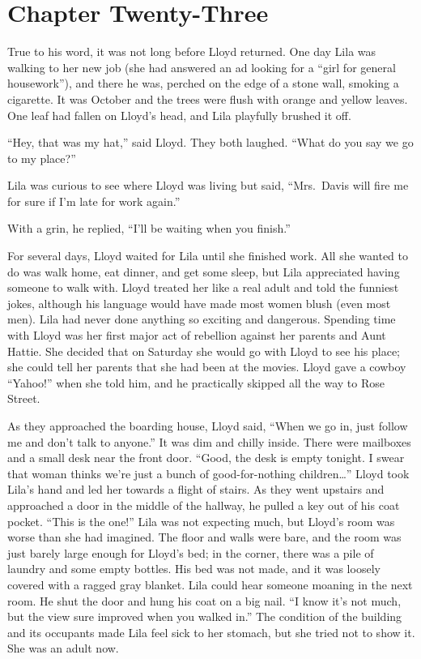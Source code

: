 \documentclass[
  american,
  letterpaper,
]{book}
\begin{document}

\chapter{Chapter Twenty-Three}\label{chapter-twenty-three}

True to his word, it was not long before Lloyd returned. One day Lila
was walking to her new job (she had answered an ad looking for a ``girl
for general housework''), and there he was, perched on the edge of a
stone wall, smoking a cigarette. It was October and the trees were flush
with orange and yellow leaves. One leaf had fallen on Lloyd's head, and
Lila playfully brushed it off.

``Hey, that was my hat,'' said Lloyd. They both laughed. ``What do you
say we go to my place?''

Lila was curious to see where Lloyd was living but said, ``Mrs.~Davis
will fire me for sure if I'm late for work again.''

With a grin, he replied, ``I'll be waiting when you finish.''

For several days, Lloyd waited for Lila until she finished work. All she
wanted to do was walk home, eat dinner, and get some sleep, but Lila
appreciated having someone to walk with. Lloyd treated her like a real
adult and told the funniest jokes, although his language would have made
most women blush (even most men). Lila had never done anything so
exciting and dangerous. Spending time with Lloyd was her first major act
of rebellion against her parents and Aunt Hattie. She decided that on
Saturday she would go with Lloyd to see his place; she could tell her
parents that she had been at the movies. Lloyd gave a cowboy ``Yahoo!''
when she told him, and he practically skipped all the way to Rose
Street.

As they approached the boarding house, Lloyd said, ``When we go in, just
follow me and don't talk to anyone.'' It was dim and chilly inside.
There were mailboxes and a small desk near the front door. ``Good, the
desk is empty tonight. I swear that woman thinks we're just a bunch of
good-for-nothing children\ldots{}'' Lloyd took Lila's hand and led her
towards a flight of stairs. As they went upstairs and approached a door
in the middle of the hallway, he pulled a key out of his coat pocket.
``This is the one!'' Lila was not expecting much, but Lloyd's room was
worse than she had imagined. The floor and walls were bare, and the room
was just barely large enough for Lloyd's bed; in the corner, there was a
pile of laundry and some empty bottles. His bed was not made, and it was
loosely covered with a ragged gray blanket. Lila could hear someone
moaning in the next room. He shut the door and hung his coat on a big
nail. ``I know it's not much, but the view sure improved when you walked
in.'' The condition of the building and its occupants made Lila feel
sick to her stomach, but she tried not to show it. She was an adult now.
\end{document}

